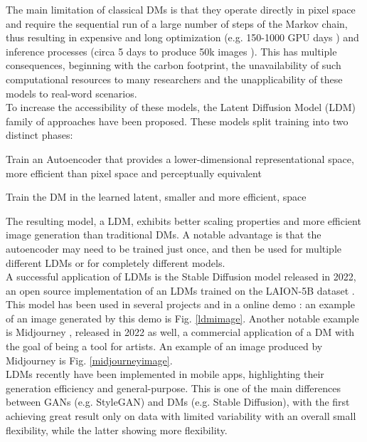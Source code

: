 \documentclass[conference]{IEEEtran}
\begin{document}
The main limitation of classical DMs is that they operate directly in pixel space and require the sequential run of a large number of steps of the Markov chain, thus resulting in expensive and long optimization (e.g. 150-1000 GPU days \cite{gpudays}) and inference processes (circa 5 days to produce 50k images \cite{gpudays}). This has multiple consequences, beginning with the carbon footprint, the unavailability of such computational resources to many researchers and the unapplicability of these models to real-word scenarios.\\
To increase the accessibility of these models, the Latent Diffusion Model (LDM) \cite{latentdiffusionpaper} family of approaches have been proposed. These models split training into two distinct phases:
\begin{list}{-}{}
	\item Train an Autoencoder \cite{autoencoders} that provides a lower-dimensional representational space, more efficient than pixel space and perceptually equivalent
	\item Train the DM in the learned latent, smaller and more efficient, space
\end{list}
The resulting model, a LDM, exhibits better scaling properties and more efficient image generation than traditional DMs. A notable advantage is that the autoencoder may need to be trained just once, and then be used for multiple different LDMs or for completely different models.\\
A successful application of LDMs is the Stable Diffusion model \cite{stablediffusionesource} released in 2022, an open source implementation of an LDMs trained on the LAION-5B dataset \cite{laion5b}. This model has been used in several projects \cite{stablediffusionprojects} and in a online demo \cite{stablediffusiondemo}: an example of an image generated by this demo is Fig. \ref{ldmimage}. Another notable example is Midjourney \cite{midjourney}, released in 2022 as well, a commercial application of a DM with the goal of being a tool for artists. An example of an image produced by Midjourney is Fig. \ref{midjourneyimage}.\\
LDMs recently have been implemented in mobile apps, highlighting their generation efficiency and general-purpose. This is one of the main differences between GANs (e.g. StyleGAN) and DMs (e.g. Stable Diffusion), with the first achieving great result only on data with limited variability with an overall small flexibility, while the latter showing more flexibility.
\end{document}
